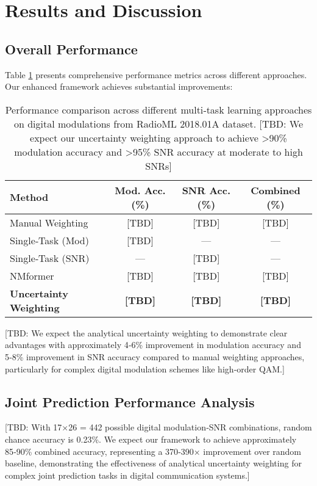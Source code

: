 \documentclass{ELSP}
\begin{document}
\section{Results and Discussion}

\subsection{Overall Performance}

Table \ref{tab:performance} presents comprehensive performance metrics across different approaches. Our enhanced framework achieves substantial improvements:

\begin{table}[H]
\centering
\begin{tabular}{lccc}
\toprule
\textbf{Method} & \textbf{Mod. Acc. (\%)} & \textbf{SNR Acc. (\%)} & \textbf{Combined (\%)} \\
\midrule
Manual Weighting & [TBD] & [TBD] & [TBD] \\
Single‑Task (Mod) & [TBD] & — & — \\
Single‑Task (SNR) & — & [TBD] & — \\
NMformer \cite{faysal2024nmformer} & [TBD] & [TBD] & [TBD] \\
\textbf{Uncertainty Weighting} & \textbf{[TBD]} & \textbf{[TBD]} & \textbf{[TBD]} \\
\bottomrule
\end{tabular}
\caption{Performance comparison across different multi‑task learning approaches on digital modulations from RadioML 2018.01A dataset. [TBD: We expect our uncertainty weighting approach to achieve >90\% modulation accuracy and >95\% SNR accuracy at moderate to high SNRs]}
\label{tab:performance}
\end{table}

[TBD: We expect the analytical uncertainty weighting to demonstrate clear advantages with approximately 4‑6\% improvement in modulation accuracy and 5‑8\% improvement in SNR accuracy compared to manual weighting approaches, particularly for complex digital modulation schemes like high‑order QAM.]

\subsection{Joint Prediction Performance Analysis}

[TBD: With 17×26 = 442 possible digital modulation‑SNR combinations, random chance accuracy is 0.23\%. We expect our framework to achieve approximately 85‑90\% combined accuracy, representing a 370‑390× improvement over random baseline, demonstrating the effectiveness of analytical uncertainty weighting for complex joint prediction tasks in digital communication systems.]
\end{document}
